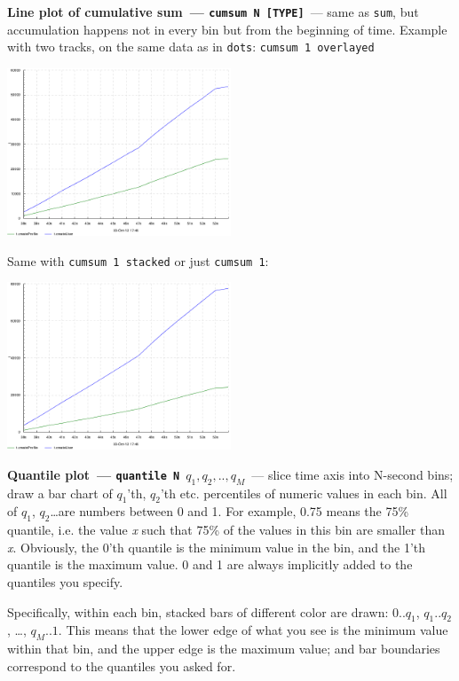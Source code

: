 \documentclass{article}
\begin{document}
\pagebreak
\noindent
\textbf{Line plot of cumulative sum~--- \texttt{cumsum N [TYPE]}}~--- same as \texttt{sum}, but accumulation happens not in every bin but from the beginning of time.
Example with two tracks, on the same data as in \texttt{dots}: \texttt{cumsum 1 overlayed}

\centerline{\includegraphics[width=0.5\textwidth]{pics/tplot/cumsum-create-user-and-profile-overlayed.png}}

Same with \texttt{cumsum 1 stacked} or just \texttt{cumsum 1}:

\centerline{\includegraphics[width=0.5\textwidth]{pics/tplot/cumsum-create-user-and-profile-stacked.png}}

\pagebreak
\noindent
\textbf{Quantile plot~--- \texttt{quantile N $q_1,q_2,..,q_M$}}~--- slice time axis into N-second bins; draw a bar chart of $q_1$'th, $q_2$'th etc. percentiles of numeric values in each bin. All of $q_1$, $q_2$\ldots are numbers between 0 and 1. For example, 0.75 means the 75\% quantile, i.e. the value \emph{x} such that 75\% of the values in this bin are smaller than \emph{x}. Obviously, the 0'th quantile is the minimum value in the bin, and the 1'th quantile is the maximum value. 0 and 1 are always implicitly added to the quantiles you specify.

Specifically, within each bin, stacked bars of different color are drawn: $0..q_1$, $q_1..q_2$, \ldots, $q_M..1$. This means that the lower edge of what you see is the minimum value within that bin, and the upper edge is the maximum value; and bar boundaries correspond to the quantiles you asked for.
\end{document}
